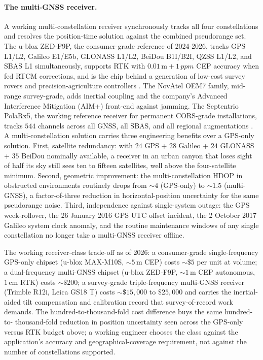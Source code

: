 \paragraph{The multi-GNSS receiver.} A working multi-constellation
receiver synchronously tracks all four constellations and resolves
the position-time solution against the combined pseudorange set.
The u-blox ZED-F9P, the consumer-grade reference of 2024-2026,
tracks GPS L1/L2, Galileo E1/E5b, GLONASS L1/L2, BeiDou B1I/B2I,
QZSS L1/L2, and SBAS L1 simultaneously, supports RTK with
$0.01 \,\si{\meter} + 1 \,\si{ppm}$ CEP accuracy when fed RTCM
corrections, and is the chip behind a generation of low-cost
survey rovers and precision-agriculture controllers
\cite{web:ch06t3b-ublox-f9p-2024}. The NovAtel OEM7 family,
mid-range survey-grade, adds inertial coupling and the company's
Advanced Interference Mitigation (AIM+) front-end against jamming.
The Septentrio PolaRx5, the working reference receiver for
permanent CORS-grade installations, tracks $544$ channels across
all GNSS, all SBAS, and all regional augmentations
\cite{web:ch06t3b-septentrio-polarx5-2024}. A multi-constellation
solution carries three engineering benefits over a GPS-only
solution. First, satellite redundancy: with $24$ GPS + $28$
Galileo + $24$ GLONASS + $35$ BeiDou nominally available, a
receiver in an urban canyon that loses sight of half its sky still
sees ten to fifteen satellites, well above the four-satellite
minimum. Second, geometric improvement: the multi-constellation
HDOP in obstructed environments routinely drops from
$\sim 4$ (GPS-only) to $\sim 1.5$ (multi-GNSS), a factor-of-three
reduction in horizontal-position uncertainty for the same
pseudorange noise. Third, independence against single-system
outage: the GPS week-rollover, the 26 January 2016 GPS UTC offset
incident, the 2 October 2017 Galileo system clock anomaly, and
the routine maintenance windows of any single constellation no
longer take a multi-GNSS receiver offline.

The working receiver-class trade-off as of 2026: a consumer-grade
single-frequency GPS-only chipset (u-blox MAX-M10S, $\sim 5 \,\si
{\meter}$ CEP) costs $\sim \$5$ per unit at volume; a
dual-frequency multi-GNSS chipset (u-blox ZED-F9P,
$\sim 1 \,\si{\meter}$ CEP autonomous, $1 \,\si{\centi\meter}$ RTK)
costs $\sim \$200$; a survey-grade triple-frequency multi-GNSS
receiver (Trimble R12i, Leica GS18 T) costs $\sim \$15{,}000$ to
$\$25{,}000$ and carries the inertial-aided tilt compensation and
calibration record that survey-of-record work demands. The
hundred-to-thousand-fold cost difference buys the same hundred-to-
thousand-fold reduction in position uncertainty seen across the
GPS-only versus RTK budget above; a working engineer chooses the
class against the application's accuracy and geographical-coverage
requirement, not against the number of constellations supported.


